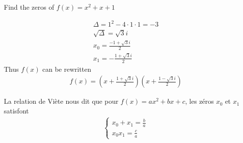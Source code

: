\begin{myExample}
	Find the zeros of $f(x)=x^2+x+1$
	
	\begin{eqnarray*}
		\Delta = 1^2-4\cdot1\cdot1=-3\\
		\sqrt{\Delta}=\sqrt{3}i\\
		x_0=\frac{-1+\sqrt{3}i}{2}\\
		x_1=-\frac{1+\sqrt3i}{2}
	\end{eqnarray*}
	Thus $f(x)$ can be rewritten
	\begin{eqnarray*}
		f(x)=\left(x+\frac{1+\sqrt3i}{2}\right)\left(x+\frac{1-\sqrt{3}i}{2}\right)
	\end{eqnarray*}
\end{myExample}
La relation de Viète nous dit que pour $f(x)=ax^2+bx+c$, les zéros $x_0$ et $x_1$ satisfont
\begin{eqnarray}
	\begin{cases}
		x_0+x_1=\frac{b}{a}\\
		x_0x_1=\frac{c}{a}
	\end{cases}
\end{eqnarray}